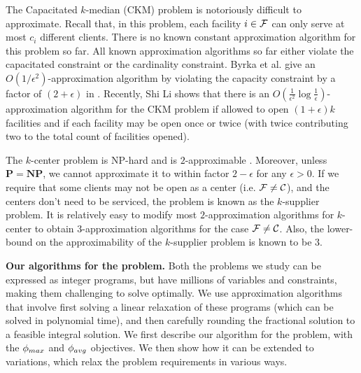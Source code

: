 The Capacitated $k$-median (CKM) problem is notoriously difficult to approximate. Recall that, in this problem, each facility $i \in \mathcal{F}$ can only serve at most $c_i$ different clients. There is no known constant approximation algorithm for this problem so far. All known approximation algorithms so far either violate the capacitated constraint or the cardinality constraint. Byrka et al. give an $O(1/\epsilon^2)$-approximation algorithm by violating the capacity constraint by a factor of $(2+\epsilon)$ in \cite{byrka_ckm}. Recently, Shi Li \cite{li_ckm} shows that there is an $O\left(\frac{1}{\epsilon^2} \log \frac{1}{\epsilon} \right) $-approximation algorithm for the CKM problem if allowed to open $(1+\epsilon)k$ facilities and if each facility may be 
open once or twice (with twice contributing two to the total count of facilities opened).

The $k$-center problem is NP-hard and is $2$-approximable \cite{book:ws}. Moreover, unless $\mathbf{P} = \mathbf{NP}$, we cannot approximate it to within factor $2-\epsilon$ for any $\epsilon>0$. 
If we require that some clients may not be open as a center (i.e. $\mathcal{F} \neq \mathcal{C}$), and the centers don't need to be serviced,
the problem is known as the $k$-supplier problem. It is relatively easy to modify most $2$-approximation algorithms for $k$-center to obtain $3$-approximation algorithms for the case $\mathcal{F} \neq \mathcal{C}$. Also, the lower-bound 
on the approximability of the $k$-supplier problem is known to be $3$.

\noindent
\textbf{Our algorithms for the \probstatic{} problem.}
Both the problems we study can be expressed as integer programs, but have millions of variables and
constraints, making them challenging to solve optimally.
We use approximation algorithms that involve first solving a linear relaxation of these programs
(which can be solved in polynomial time), and then carefully rounding the fractional solution 
to a feasible integral solution. We first describe our algorithm for the \probstatic{} problem,
with the $\phi_{max}$ and $\phi_{avg}$ objectives. We then show how it can be extended to variations,
which relax the problem requirements in various ways.

